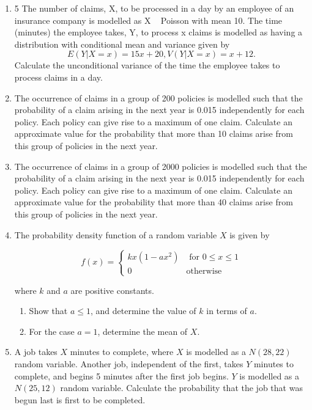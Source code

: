 \documentclass[a4paper,12pt]{article}
\begin{document}
\begin{enumerate}
\item 5 The number of claims, X, to be processed in a day by an employee of an insurance company is modelled as X ~ Poisson with mean 10. The time (minutes) the
employee takes, Y, to process x claims is modelled as having a distribution with conditional mean and variance given by
\[E(Y|X = x) = 15x + 20 , V(Y|X = x) = x + 12.\]
Calculate the unconditional variance of the time the employee takes to process
claims in a day. 

 \item The occurrence of claims in a group of 200 policies is modelled such that
the probability of a claim arising in the next year is 0.015 independently for each policy. Each policy can give rise to a maximum of one claim.
Calculate an approximate value for the probability that more than 10 claims arise from this group of policies in the next year. 
\item The occurrence of claims in a group of 2000 policies is modelled such that
the probability of a claim arising in the next year is 0.015 independently for each policy. Each policy can give rise to a maximum of one claim. Calculate an approximate value for the probability that more than 40
claims arise from this group of policies in the next year. 

\item The probability density function of a random variable $X$ is given by

\[ f(x) = \begin{cases} kx(1-ax^2) & \mbox{ for } 0 \leq x \leq 1 \\
0 & \mbox{otherwise}
\end{cases}
\]

where $k$ and $a$ are positive constants.
\begin{enumerate}
\item Show that $a \leq 1$, and determine the value of $k$ in terms of $a$. 
\item For the case $a = 1$, determine the mean of $X$. 
\end{enumerate}

\item A job takes $X$ minutes to complete, where $X$ is modelled as a $N(28,22)$ random
variable. Another job, independent of the first, takes $Y$ minutes to complete, and begins 5 minutes after the first job begins. $Y$ is modelled as a $N(25,12)$ random
variable.
Calculate the probability that the job that was begun last is first to be completed.
\end{enumerate}
\end{document}
